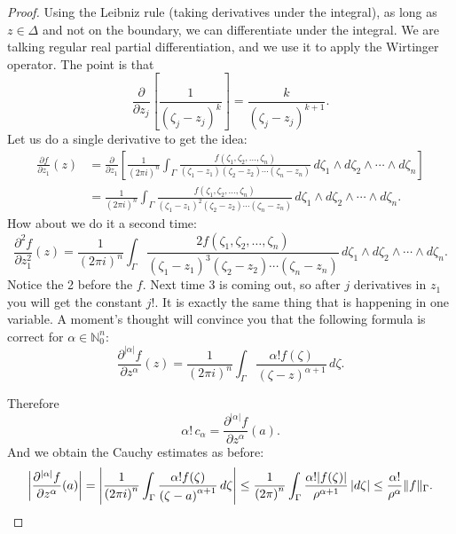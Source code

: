 \documentclass[12pt,openany]{book}
\newcommand{\sabs}[1]{\lvert {#1} \rvert}
\newcommand{\snorm}[1]{\lVert {#1} \rVert}
\newcommand{\abs}[1]{\left\lvert {#1} \right\rvert}
\newcommand{\N}{{\mathbb{N}}}
\theoremstyle{plain}
\theoremstyle{remark}
\theoremstyle{definition}
\theoremstyle{exercise}
\theoremstyle{example}
\begin{document}
\begin{proof}
Using the Leibniz rule (taking derivatives under the integral),
as long as $z \in \Delta$ and not on the boundary,
we can differentiate under the integral.  We are talking regular real
partial differentiation, and we use it to apply the Wirtinger operator.
The point is that
\begin{equation*}
\frac{\partial}{\partial z_j} \left[
\frac{1}{{(\zeta_j-z_j)}^k} \right]
=
\frac{k}{{(\zeta_j-z_j)}^{k+1}} .
\end{equation*}
Let us do a single derivative to
get the idea:
\begin{equation*}
\begin{split}
\frac{\partial f}{\partial z_1}(z) &=
\frac{\partial}{\partial z_1} \left[
\frac{1}{{(2\pi i)}^n}
\int_{\Gamma}
\frac{f(\zeta_1,\zeta_2,\ldots,\zeta_n)}{(\zeta_1-z_1)(\zeta_2-z_2)\cdots(\zeta_n-z_n)}
\,
d \zeta_1 
\wedge
d \zeta_2
\wedge
\cdots
\wedge
d \zeta_n 
\right]
\\
& =
\frac{1}{{(2\pi i)}^n}
\int_{\Gamma}
\frac{f(\zeta_1,\zeta_2,\ldots,\zeta_n)}{{(\zeta_1-z_1)}^2(\zeta_2-z_2)\cdots(\zeta_n-z_n)}
\,
d \zeta_1 
\wedge
d \zeta_2
\wedge
\cdots
\wedge
d \zeta_n .
\end{split}
\end{equation*}
How about we do it a second time:
\begin{equation*}
\frac{\partial^2 f}{\partial z_1^2}(z) 
=
\frac{1}{{(2\pi i)}^n}
\int_{\Gamma}
\frac{2 f(\zeta_1,\zeta_2,\ldots,\zeta_n)}{{(\zeta_1-z_1)}^3(\zeta_2-z_2)\cdots(\zeta_n-z_n)}
\,
d \zeta_1 
\wedge
d \zeta_2
\wedge
\cdots
\wedge
d \zeta_n .
\end{equation*}
Notice the 2 before the $f$.  Next time 3 is coming out, so after $j$
derivatives in $z_1$ you will get the constant $j!$.
It is exactly the same thing that is happening in one variable.  A moment's
thought will convince you that the following formula is correct for
$\alpha \in \N_0^n$:
\begin{equation*}
\frac{\partial^{\sabs{\alpha}}f}{\partial z^\alpha} (z) =
\frac{1}{{(2\pi i)}^n}
\int_{\Gamma}
\frac{\alpha! f(\zeta)}{{(\zeta-z)}^{\alpha+1}}
\,
d \zeta .
\end{equation*}

Therefore
\begin{equation*}
\alpha! \, c_\alpha = 
\frac{\partial^{\sabs{\alpha}} f}{\partial z^\alpha} (a) .
\end{equation*}
And we obtain the Cauchy estimates as before:
\begin{equation*}
\abs{\frac{\partial^{\sabs{\alpha}}f}{\partial z^\alpha}(a)}
=
\abs{
\frac{1}{{(2\pi i)}^n}
\int_{\Gamma}
\frac{\alpha! f(\zeta)}{{(\zeta-a)}^{\alpha+1}}
\,
d \zeta }
\leq
\frac{1}{{(2\pi)}^n}
\int_{\Gamma}
\frac{\alpha! \sabs{f(\zeta)}}{\rho^{\alpha+1}}
\,
\sabs{d \zeta}
\leq
\frac{\alpha!}{\rho^\alpha}
\snorm{f}_\Gamma . \qedhere
\end{equation*}
\end{proof}
\end{document}
